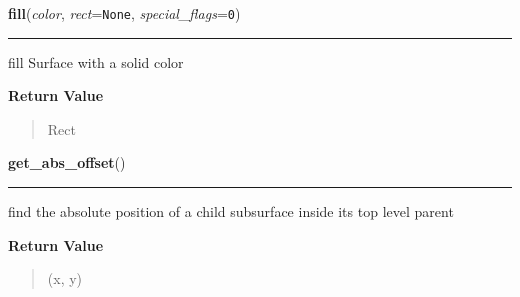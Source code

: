     \vspace{0.5ex}

\hspace{.8\funcindent}\begin{boxedminipage}{\funcwidth}

    \raggedright \textbf{fill}(\textit{color}, \textit{rect}={\tt None}, \textit{special\_flags}={\tt 0})

    \vspace{-1.5ex}

    \rule{\textwidth}{0.5\fboxrule}
\setlength{\parskip}{2ex}
    fill Surface with a solid color

\setlength{\parskip}{1ex}
      \textbf{Return Value}
    \vspace{-1ex}

      \begin{quote}
      Rect

      \end{quote}

    \end{boxedminipage}

    \label{pygame:Surface:get_abs_offset}

    \vspace{0.5ex}

\hspace{.8\funcindent}\begin{boxedminipage}{\funcwidth}

    \raggedright \textbf{get\_abs\_offset}()

    \vspace{-1.5ex}

    \rule{\textwidth}{0.5\fboxrule}
\setlength{\parskip}{2ex}
    find the absolute position of a child subsurface inside its top level 
    parent

\setlength{\parskip}{1ex}
      \textbf{Return Value}
    \vspace{-1ex}

      \begin{quote}
      (x, y)

      \end{quote}

    \end{boxedminipage}

    \label{pygame:Surface:get_abs_parent}

    \vspace{0.5ex}

